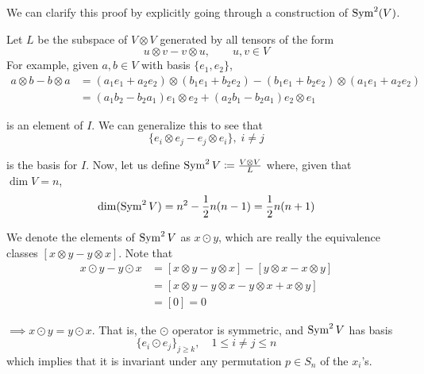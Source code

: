 	We can clarify this proof by explicitly going through a construction of $\operatorname{Sym}^2(V)$. 

	\begin{example}
	  \label{ex:construction-of-sym2v}
		Let $L$ be the subspace of $V \otimes V$ generated by all tensors of the form 
		\begin{equation}
			u \otimes v - v \otimes u, \qquad u, v \in V
		\end{equation}
		For example, given $a, b \in V$ with basis $\{e_1, e_2\}$, 
		\begin{align*}
			a \otimes b - b \otimes a & = (a_1 e_1 + a_2 e_2) \otimes (b_1 e_1 + b_2 e_2) - (b_1 e_1 + b_2 e_2) \otimes (a_1 e_1 + a_2 e_2) \\
			& = (a_1 b_2 - b_2 a_1) e_1 \otimes e_2 + (a_2 b_1 - b_2 a_1) e_2 \otimes e_1 
		\end{align*}

		is an element of $I$. We can generalize this to see that
		\begin{equation}
			\{e_i \otimes e_j - e_j \otimes e_i\}, \; i \neq j
		\end{equation}

		is the basis for $I$. Now, let us define $\operatorname{Sym}^2 V \coloneqq \frac{V \otimes V}{L}$ where, given that $\dim{V} = n$, 
		\begin{equation}
			\dim(\operatorname{Sym}^2 V) = n^2 - \frac{1}{2} n (n-1) = \frac{1}{2} n (n+1)
		\end{equation}

		We denote the elements of $\operatorname{Sym}^2 V$ as $x \odot y$, which are really the equivalence classes $[x \otimes y - y \otimes x]$. Note that
		\begin{align}
			x \odot y - y \odot x & = [x \otimes y - y \otimes x] - [y \otimes x - x \otimes y] \\
														& = [x \otimes y - y \otimes x - y \otimes x + x \otimes y] \\
														& = [0] = 0
		\end{align}

		$\implies x \odot y = y \odot x$. That is, the $\odot$ operator is symmetric, and $\operatorname{Sym}^2 V$ has basis 
		\begin{equation}
			\{e_i \odot e_j\}_{j \geq k}, \quad 1 \leq i \neq j \leq n
		\end{equation}
		which implies that it is invariant under any permutation $p \in S_n$ of the $x_i$'s. 
	\end{example}

